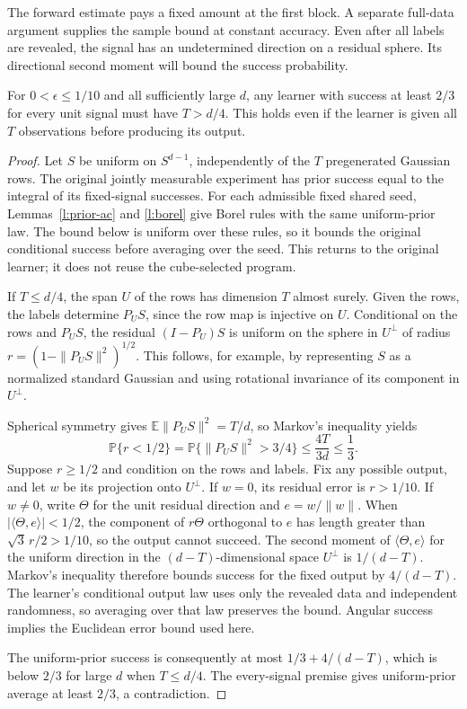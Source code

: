 The forward estimate pays a fixed amount at the first block.  A
separate full-data argument supplies the sample bound at constant
accuracy.  Even after all labels are revealed, the signal has an
undetermined direction on a residual sphere.  Its directional second
moment will bound the success probability.

\begin{lemma}
\label{lem:l-lt-residual}
For $0<\epsilon\le1/10$ and all sufficiently large $d$, any learner
with success at least $2/3$ for every unit signal must have $T>d/4$.
This holds even if the learner is given all $T$ observations before
producing its output.
\end{lemma}
\begin{proof}
Let \(S\) be uniform on \(S^{d-1}\), independently of the \(T\)
pregenerated Gaussian rows.  The original jointly measurable experiment
has prior success equal to the integral of its fixed-signal successes.
For each admissible fixed shared seed, Lemmas~\ref{l:prior-ac} and
\ref{l:borel} give Borel rules with the same uniform-prior law.
The bound below is uniform over these rules, so it bounds the original
conditional success before averaging over the seed.  This returns to
the original learner; it does not reuse the cube-selected program.

If $T\le d/4$, the span $U$ of the rows has dimension $T$ almost
surely.  Given the rows, the labels
determine $P_US$, since the row map is injective on $U$.  Conditional
on the rows and $P_US$, the residual $(I-P_U)S$ is uniform on the
sphere in $U^\perp$ of radius
$r=(1-\|P_US\|^2)^{1/2}$.  This follows, for example, by representing
$S$ as a normalized standard Gaussian and using rotational invariance
of its component in $U^\perp$.

Spherical symmetry gives $\mathbb E\|P_US\|^2=T/d$, so Markov's
inequality yields
\[
 \mathbb P\{r<1/2\}
 =\mathbb P\{\|P_US\|^2>3/4\}
 \le\frac{4T}{3d}\le\frac13.
\]
Suppose $r\ge1/2$ and condition on the rows and labels.  Fix any
possible output, and let $w$ be its projection onto $U^\perp$.
If $w=0$, its residual error is $r>1/10$.  If $w\ne0$,
write $\Theta$ for the unit residual direction and $e=w/\|w\|$.
When $|\langle\Theta,e\rangle|<1/2$, the component of $r\Theta$
orthogonal to $e$ has length greater than
$\sqrt3\,r/2>1/10$, so the output cannot succeed.  The second moment
of $\langle\Theta,e\rangle$ for the uniform direction in the
$(d-T)$-dimensional space $U^\perp$ is $1/(d-T)$.  Markov's inequality
therefore bounds success for the fixed output by $4/(d-T)$.  The
learner's conditional output law uses only the revealed data and
independent randomness, so averaging over that law preserves the bound.
Angular success implies the Euclidean error bound used here.

The uniform-prior success is consequently at most
$1/3+4/(d-T)$, which is below $2/3$ for large $d$ when $T\le d/4$.
The every-signal premise gives uniform-prior average at least $2/3$,
a contradiction.
\end{proof}

